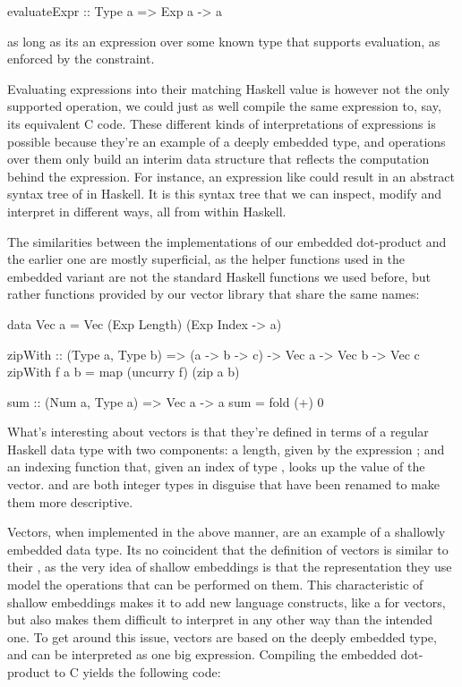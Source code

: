 \begin{code}
evaluateExpr :: Type a => Exp a -> a
\end{code}

\noindent as long as its an expression over some known type  that supports evaluation, as enforced by the  constraint.

Evaluating expressions into their matching Haskell value is however not the only supported operation, we could just as well compile the same expression to, say, its equivalent C code. These different kinds of interpretations of expressions is possible because they're an example of a deeply embedded type, and operations over them only build an interim data structure that reflects the computation behind the expression. For instance, an expression like  could result in an abstract syntax tree of  in Haskell. It is this syntax tree that we can inspect, modify and interpret in different ways, all from within Haskell. %

The similarities between the implementations of our embedded dot-product and the earlier one are mostly superficial, as the helper functions used in the embedded variant are not the standard Haskell functions we used before, but rather functions provided by our vector library that share the same names:

\begin{code}
data Vec a = Vec (Exp Length) (Exp Index -> a)

zipWith :: (Type a, Type b) => (a -> b -> c) -> Vec a -> Vec b -> Vec c
zipWith f a b = map (uncurry f) (zip a b)

sum :: (Num a, Type a) => Vec a -> a
sum = fold (+) 0
\end{code}

\noindent What's interesting about vectors is that they're defined in terms of a regular Haskell data type with two components: a length, given by the expression ; and an indexing function  that, given an index of type , looks up the value  of the vector.  and  are both integer types in disguise that have been renamed to make them more descriptive.

Vectors, when implemented in the above manner, are an example of a shallowly embedded data type. Its no coincident that the definition of vectors is similar to their , as the very idea of shallow embeddings is that the representation they use model the operations that can be performed on them. This characteristic of shallow embeddings makes it  to add new language constructs, like a  for vectors, but also makes them difficult to interpret in any other way than the intended one. To get around this issue, vectors are based on the deeply embedded  type, and can be interpreted as one big expression. Compiling the embedded dot-product to C yields the following code:

